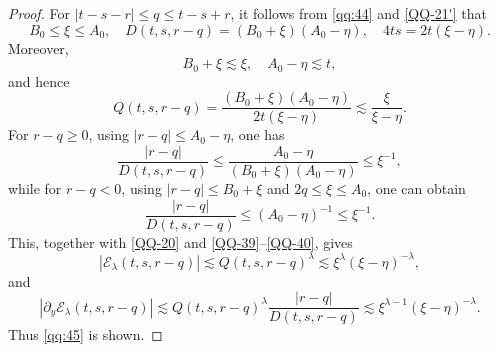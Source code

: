 \documentclass[11pt,twoside]{article}
\newcommand{\p}{\partial}
\newcommand{\f}{\frac}
\newcommand{\Ecal}{\mathcal E}
\theoremstyle{plain}
\theoremstyle{definition}
\theoremstyle{remark}
\numberwithin{equation}{section}
\begin{document}
\begin{proof}
For $|t-s-r|\leq q\leq t-s+r$, it follows from \eqref{qq:44} and
\eqref{QQ-21'} that
\[
B_0\leq\xi\leq A_0,
\quad
D(t,s,r-q)=(B_0+\xi)(A_0-\eta),
\quad
4ts=2t(\xi-\eta).
\]
Moreover,
\begin{equation}\label{QQ-39'}
B_0+\xi\lesssim\xi,
\quad
A_0-\eta\lesssim t,
\end{equation}
and hence
\begin{equation}\label{QQ-39}
Q(t,s,r-q)
=\f{(B_0+\xi)(A_0-\eta)}
{2t(\xi-\eta)}
\lesssim
\f{\xi}{\xi-\eta}.
\end{equation}
For $r-q\geq0$, using $|r-q|\leq A_0-\eta$, one has
\[
\f{|r-q|}{D(t,s,r-q)}
\leq
\f{A_0-\eta}{(B_0+\xi)(A_0-\eta)}
\leq
\xi^{-1},
\]
while for $r-q<0$, using $|r-q|\leq B_0+\xi$ and
$2q\leq\xi\leq A_0$, one can obtain
\begin{equation}\label{QQ-40}
\f{|r-q|}{D(t,s,r-q)}
\leq
(A_0-\eta)^{-1}
\leq
\xi^{-1}.
\end{equation}
This, together with \eqref{QQ-20} and
\eqref{QQ-39}--\eqref{QQ-40}, gives
\[
|\Ecal_\lambda(t,s,r-q)|
\lesssim
Q(t,s,r-q)^\lambda
\lesssim
\xi^\lambda(\xi-\eta)^{-\lambda},
\]
and
\[
|\p_y\Ecal_\lambda(t,s,r-q)|
\lesssim
Q(t,s,r-q)^\lambda
\f{|r-q|}{D(t,s,r-q)}
\lesssim
\xi^{\lambda-1}(\xi-\eta)^{-\lambda}.
\]
Thus \eqref{qq:45} is shown.


\end{proof}
\end{document}
